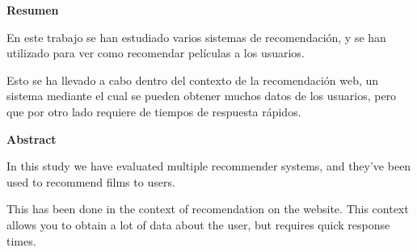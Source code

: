 \documentclass[a4paper,12pt,catalan]{book}
\begin{document}
\vfill{}

{\par\centering \textbf{\large Resumen}\large \par}

En este trabajo se han estudiado varios sistemas de recomendación, y se han utilizado para ver como recomendar películas a los usuarios.

Esto se ha llevado a cabo dentro del contexto de la recomendación web, un sistema mediante el cual se pueden obtener muchos datos de los usuarios, pero que por otro lado requiere de tiempos de respuesta rápidos.

\vfill{}

{\par\centering \textbf{\large Abstract}\large \par}

In this study we have evaluated multiple recommender systems, and they've been used to recommend films to users.

This has been done in the context of recomendation on the website. This context allows you to obtain a lot of data about the user, but requires quick response times.

\vfill{}
\end{document}
